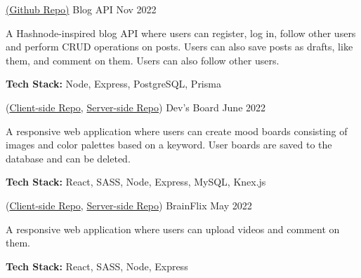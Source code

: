 

\begin{cventries}

  \cventry
    {\href{https://github.com/LamiSaadat/blog-api}{(Github Repo)}} %
    {Blog API} %
    {} %
    {Nov 2022} %
    {
      \begin{cvitems} %
        \item {A Hashnode-inspired blog API where users can register, log in, follow other users and perform CRUD operations on posts. Users can also save posts as drafts, like them, and comment on them. Users can also follow other users.}
        \item {\textbf{Tech Stack:} Node, Express, PostgreSQL, Prisma}
      \end{cvitems}
    }


  \cventry
    {(\href{https://github.com/LamiSaadat/devs-board-client}{Client-side Repo}, \href{https://github.com/LamiSaadat/devs-board-server}{Server-side Repo})} %
    {Dev's Board} %
    {} %
    {June 2022} %
    {
      \begin{cvitems} %
        \item {A responsive web application where users can create mood boards consisting of images and color palettes based on a keyword. User boards are saved to the database and can be deleted.}
        \item {\textbf{Tech Stack:} React, SASS, Node, Express, MySQL, Knex.js}
      \end{cvitems}
    }

  \cventry
    {(\href{https://github.com/LamiSaadat/lamisa-saadat-brainflix}{Client-side Repo}, \href{https://github.com/LamiSaadat/lamisa-saadat-brainflix-api}{Server-side Repo})} %
    {BrainFlix} %
    {} %
    {May 2022} %
    {
      \begin{cvitems} %
        \item {A responsive web application where users can upload videos and comment on them.}
        \item {\textbf{Tech Stack:} React, SASS, Node, Express}
      \end{cvitems}
    }

\end{cventries}
